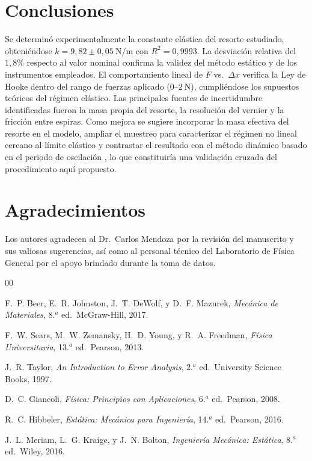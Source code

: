 \documentclass[conference,10pt]{IEEEtran}
\begin{document}
\section{Conclusiones}
\label{sec:conc}
Se determinó experimentalmente la constante elástica del resorte
estudiado, obteniéndose $k = 9{,}82 \pm 0{,}05\ \mathrm{N/m}$ con
$R^2 = 0{,}9993$. La desviación relativa del $1{,}8\%$ respecto al
valor nominal confirma la validez del método estático y de los
instrumentos empleados. El comportamiento lineal de
$F$ vs.\ $\Delta x$ verifica la Ley de Hooke dentro del rango de
fuerzas aplicado ($0$--$2\ \mathrm{N}$), cumpliéndose los supuestos
teóricos del régimen elástico. Las principales fuentes de
incertidumbre identificadas fueron la masa propia del resorte, la
resolución del vernier y la fricción entre espiras. Como mejora se
sugiere incorporar la masa efectiva del resorte en el modelo,
ampliar el muestreo para caracterizar el régimen no lineal cercano
al límite elástico y contrastar el resultado con el método dinámico
basado en el periodo de oscilación \cite{Sears2013}, lo que
constituiría una validación cruzada del procedimiento aquí propuesto.

\section*{Agradecimientos}
Los autores agradecen al Dr.~Carlos Mendoza por la revisión del
manuscrito y sus valiosas sugerencias, así como al personal técnico
del Laboratorio de Física General por el apoyo brindado durante la
toma de datos.

\begin{thebibliography}{00}

F.~P. Beer, E.~R. Johnston, J.~T. DeWolf, y D.~F. Mazurek,
\emph{Mecánica de Materiales}, 8.$^a$ ed.\ McGraw-Hill, 2017.

F.~W. Sears, M.~W. Zemansky, H.~D. Young, y R.~A. Freedman,
\emph{Física Universitaria}, 13.$^a$ ed.\ Pearson, 2013.

J.~R. Taylor, \emph{An Introduction to Error Analysis},
2.$^a$ ed.\ University Science Books, 1997.

D.~C. Giancoli, \emph{Física: Principios con Aplicaciones},
6.$^a$ ed.\ Pearson, 2008.

R.~C. Hibbeler, \emph{Estática: Mecánica para Ingeniería},
14.$^a$ ed.\ Pearson, 2016.

J.~L. Meriam, L.~G. Kraige, y J.~N. Bolton,
\emph{Ingeniería Mecánica: Estática}, 8.$^a$ ed.\ Wiley, 2016.

\end{thebibliography}
\end{document}
